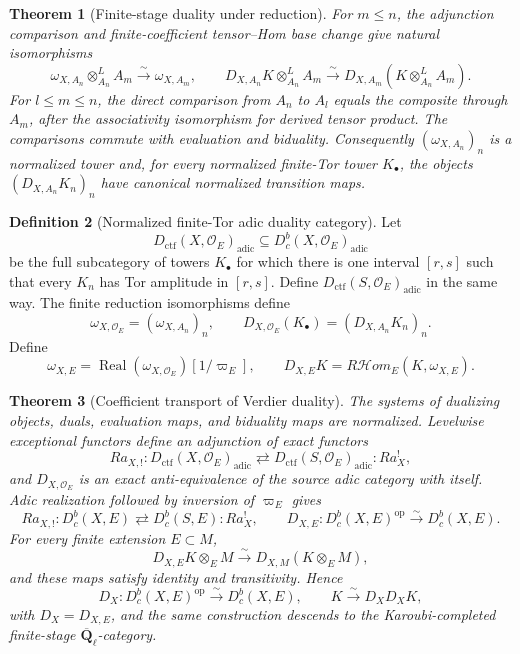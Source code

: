 \documentclass[10pt]{article}
\newtheorem{theorem}{Theorem}[section]
\theoremstyle{definition}
\newtheorem{definition}[theorem]{Definition}
\newcommand{\Qlb}{\overline{\mathbf Q}_\ell}
\newcommand{\Dbc}{D^b_c}
\begin{document}
\begin{theorem}[Finite-stage duality under reduction]
For \(m\leq n\), the adjunction comparison and finite-coefficient
tensor--Hom base change give natural isomorphisms
\[
 \omega_{X,A_n}\otimes_{A_n}^LA_m\xrightarrow{\sim}\omega_{X,A_m},
 \qquad
 D_{X,A_n}K\otimes_{A_n}^LA_m
 \xrightarrow{\sim}D_{X,A_m}(K\otimes_{A_n}^LA_m).
\]
For \(l\leq m\leq n\), the direct comparison from \(A_n\) to \(A_l\)
equals the composite through \(A_m\), after the associativity isomorphism
for derived tensor product.  The comparisons commute with evaluation and
biduality.  Consequently \((\omega_{X,A_n})_n\) is a normalized tower and,
for every normalized finite-Tor tower \(K_\bullet\), the objects
\((D_{X,A_n}K_n)_n\) have canonical normalized transition maps.
\end{theorem}

\begin{definition}[Normalized finite-Tor adic duality category]
Let
\[
 D_{\mathrm{ctf}}(X,\mathcal O_E)_{\mathrm{adic}}
 \subseteq D^b_c(X,\mathcal O_E)_{\mathrm{adic}}
\]
be the full subcategory of towers \(K_\bullet\) for which there is one
interval \([r,s]\) such that every \(K_n\) has Tor amplitude in
\([r,s]\).
Define \(D_{\mathrm{ctf}}(S,\mathcal O_E)_{\mathrm{adic}}\) in the same
way.  The finite reduction isomorphisms define
\[
 \omega_{X,\mathcal O_E}=(\omega_{X,A_n})_n,
 \qquad
 D_{X,\mathcal O_E}(K_\bullet)
       =(D_{X,A_n}K_n)_n.
\]
Define
\[
 \omega_{X,E}
  =\operatorname{Real}(\omega_{X,\mathcal O_E})[1/\varpi_E],
 \qquad
 D_{X,E}K=R\mathcal Hom_E(K,\omega_{X,E}).
\]
\end{definition}

\begin{theorem}[Coefficient transport of Verdier duality]
The systems of dualizing objects, duals, evaluation maps, and biduality
maps are normalized.  Levelwise exceptional functors define an adjunction
of exact functors
\[
 Ra_{X,!}:D_{\mathrm{ctf}}(X,\mathcal O_E)_{\mathrm{adic}}
 \rightleftarrows D_{\mathrm{ctf}}(S,\mathcal O_E)_{\mathrm{adic}}:Ra_X^!,
\]
and \(D_{X,\mathcal O_E}\) is an exact anti-equivalence of the source
adic category with itself.  Adic realization followed by inversion of
\(\varpi_E\) gives
\[
 Ra_{X,!}:\Dbc(X,E)\rightleftarrows\Dbc(S,E):Ra_X^!,
 \qquad
 D_{X,E}:\Dbc(X,E)^{\mathrm{op}}\xrightarrow{\sim}\Dbc(X,E).
\]
For every finite extension
\(E\subset M\),
\[
 D_{X,E}K\otimes_E M\xrightarrow{\sim}D_{X,M}(K\otimes_E M),
\]
and these maps satisfy identity and transitivity.  Hence
\[
 D_X:\Dbc(X,E)^{\mathrm{op}}\xrightarrow{\sim}\Dbc(X,E),
 \qquad K\xrightarrow{\sim}D_XD_XK,
\]
with \(D_X=D_{X,E}\), and the same construction
descends to the Karoubi-completed finite-stage \(\Qlb\)-category.
\end{theorem}
\end{document}
